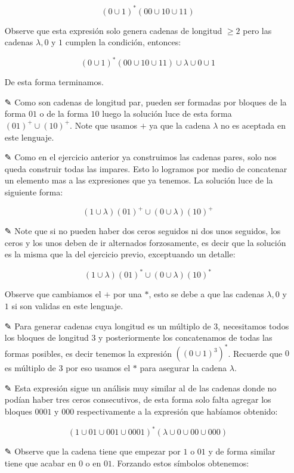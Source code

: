\begin{itemize}
    $$(0\cup1)^*(00\cup10\cup11)$$

    Observe que esta expresión solo genera cadenas de longitud $\geq2$ pero las cadenas $\lambda,0$ y $1$ cumplen la condición, entonces:

    $$(0\cup1)^*(00\cup10\cup11)\cup\lambda\cup0\cup1$$

    De esta forma terminamos.

    \item[✎]Como son cadenas de longitud par, pueden ser formadas por bloques de la forma $01$ o de la forma $10$ luego la solución luce de esta forma $(01)^+\cup(10)^+$. Note que usamos $+$ ya que la cadena $\lambda$ no es aceptada en este lenguaje.

    \item[✎]Como en el ejercicio anterior ya construimos las cadenas pares, solo nos queda construir todas las impares. Esto lo logramos por medio de concatenar un elemento mas a las expresiones que ya tenemos. La solución luce de la siguiente forma:

    $$(1\cup\lambda)(01)^+\cup(0\cup\lambda)(10)^+$$

    \item[✎]Note que si no pueden haber dos ceros seguidos ni dos unos seguidos, los ceros y los unos deben de ir alternados forzosamente, es decir que la solución es la misma que la del ejercicio previo, exceptuando un detalle:

     $$(1\cup\lambda)(01)^*\cup(0\cup\lambda)(10)^*$$

     Observe que cambiamos el $+$ por una $*$, esto se debe a que las cadenas $\lambda,0$ y $1$ si son validas en este lenguaje.

     \item[✎]Para generar cadenas cuya longitud es un múltiplo de 3, necesitamos todos los bloques de longitud $3$ y posteriormente los concatenamos de todas las formas posibles, es decir tenemos la expresión $\left((0\cup1)^3\right)^*$. Recuerde que $0$ es múltiplo de $3$ por eso usamos el $*$ para asegurar la cadena $\lambda$.

      \item[✎]Esta expresión sigue un análisis muy similar al de las cadenas donde no podían haber tres ceros consecutivos, de esta forma solo falta agregar los bloques $0001$ y $000$ respectivamente a la expresión que habíamos obtenido:

      $$(1\cup01\cup001\cup0001)^*(\lambda\cup0\cup00\cup000)$$

      \item[✎]Observe que la cadena tiene que empezar por $1$ o $01$ y de forma similar tiene que acabar en $0$ o en $01$. Forzando estos símbolos obtenemos:


\end{itemize}
